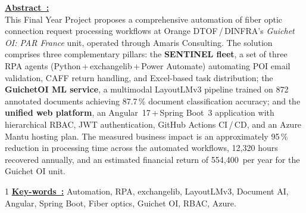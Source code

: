 \underline{\textbf{Abstract~:}}\\
This Final Year Project proposes a comprehensive automation of fiber optic connection
request processing workflows at Orange DTOF\,/\,DINFRA's \textit{Guichet OI: PAR
France} unit, operated through Amaris Consulting. The solution comprises three
complementary pillars: the \textbf{SENTINEL fleet}, a set of three RPA agents
(Python\,+\,exchangelib\,+\,Power Automate) automating POI email validation, CAFF
return handling, and Excel-based task distribution; the \textbf{GuichetOI ML
service}, a multimodal LayoutLMv3 pipeline trained on 872 annotated documents
achieving 87.7\,\% document classification accuracy; and the \textbf{unified web
platform}, an Angular~17\,+\,Spring Boot~3 application with hierarchical RBAC, JWT
authentication, GitHub Actions CI\,/\,CD, and an Azure Mantu hosting plan. The measured
business impact is an approximately 95\,\% reduction in processing time across the
automated workflows, 12,320 hours recovered annually, and an estimated financial
return of 554,400\,\texteuro{} per year for the Guichet OI unit.

\begin{spacing}{1}
\underline{\textbf{Key-words~:}} Automation, RPA, exchangelib, LayoutLMv3, Document AI,
Angular, Spring Boot, Fiber optics, Guichet OI, RBAC, Azure.\\
\end{spacing}
